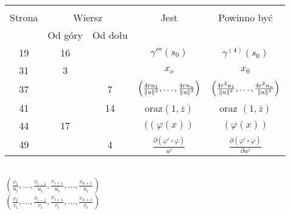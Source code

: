 \documentclass[a4paper,11pt]{article}
\begin{document}
\begin{center}

  \begin{tabular}{|c|c|c|c|c|}
    \hline
    & \multicolumn{2}{c|}{} & & \\
    Strona & \multicolumn{2}{c|}{Wiersz} & Jest
                              & Powinno być \\ \cline{2-3}
    & Od góry & Od dołu & & \\
    \hline
    19  & 16 & & $\gamma'''( s_{ 0 } )$ & $\gamma^{ (4) }( s_{ 0 } )$ \\
    31  &  3 & & $x_{ o }$ & $x_{ 0 }$ \\
    37  & & 7 & $\left( \frac{ 4 r u_{ 1 } }{ \lVert{  u  }\rVert^{ 2 } }, \ldots,
                \frac{ 4 r u_{ n } }{ \lVert{  u  }\rVert^{ 2 } } \right)$
           & $\left( \frac{ 4 r^{ 2 } u_{ 1 } }{ \lVert{  u  }\rVert^{ 2 } },
             \ldots, \frac{ 4 r^{ 2 } u_{ n } }{ \lVert{  u  }\rVert^{ 2 } }
             \right)$ \\
    41  & & 14 & oraz$( 1, \bar{ z } )$ & oraz $( 1, \bar{ z } )$ \\
    44  & 17 & & $( ( \varphi( x ) )$ & $( \varphi( x ) )$ \\
    49  & &  4 & $\frac{ \partial ( \varphi^{ i } \circ \varphi ) }{ u^{ j } }$
           & $\frac{ \partial ( \varphi^{ i } \circ \varphi ) }{ \partial u^{ j } }$ \\
    \hline
  \end{tabular}

\end{center}


\noindent
{} \\
\Jest
$( \frac { v_{ 1 } }{ u_{ i } }, \ldots, \frac{ v_{ i - 1 } }{ u_{ i } },
\frac{ v_{ i + 1 } }{ u_{ i } }, \ldots, \frac{ v_{ n + 1 } }{ u_{ i } } )$ \\
\Powin
$( \frac{ v_{ 1 } }{ v_{ i } }, \ldots, \frac{ v_{ i - 1 } }{ v_{ i } },
\frac{ v_{ i + 1 } }{ v_{ i } }, \ldots, \frac{ v_{ n + 1 } }{ v_{ i } } )$ \\

\vspace{\spaceTwo}










\end{document}
